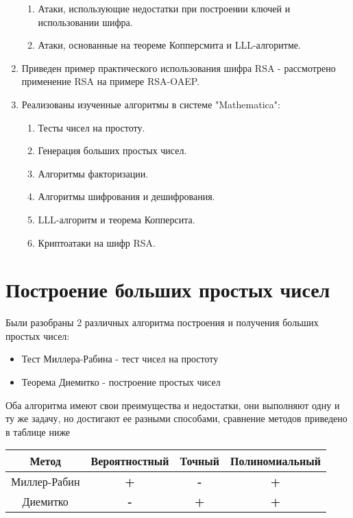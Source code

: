 \begin{enumerate}
      	\begin{enumerate}
      		\item Атаки, использующие недостатки при построении ключей и использовании шифра.
      		\item Атаки, основанные на теореме Копперсмита и LLL-алгоритме.    
      	\end{enumerate}
      \item Приведен пример практического использования шифра RSA - рассмотрено применение RSA на примере RSA-OAEP.      
      \item Реализованы изученные алгоритмы в системе "Mathematica":
      	\begin{enumerate}
          \item Тесты чисел на простоту.
          \item Генерация больших простых чисел.
          \item Алгоритмы факторизации.
          \item Алгоритмы шифрования и дешифрования.
          \item LLL-алгоритм и теорема Копперсита.
          \item Криптоатаки на шифр RSA.
        \end{enumerate}
\end{enumerate}

\section*{Построение больших простых чисел}
	Были разобраны 2 различных алгоритма построения и получения больших простых чисел:
		\begin{itemize}
			\item Тест Миллера-Рабина - тест чисел на простоту 
			\item Теорема Диемитко - построение простых чисел        
		\end{itemize}

	Оба алгоритма имеют свои преимущества и недостатки, они выполняют одну и ту же задачу, но достигают ее разными способами, сравнение методов 
	приведено в таблице ниже

	\begin{table}[h]
		\centering	
		\begin{tabular}{|c|c|c|c|}	
			\hline  		     
		    \textbf{Метод} & \textbf{Вероятностный} & \textbf{Точный} & \textbf{Полиномиальный} \\ \hline		    
		    Миллер-Рабин        & \textbf{+}           & \textbf{-}                & \textbf{+}             \\ \hline
		    Диемитко            & \textbf{-}           & \textbf{+}                & \textbf{+}             \\	\hline	  		    
		\end{tabular} 
	\end{table}

